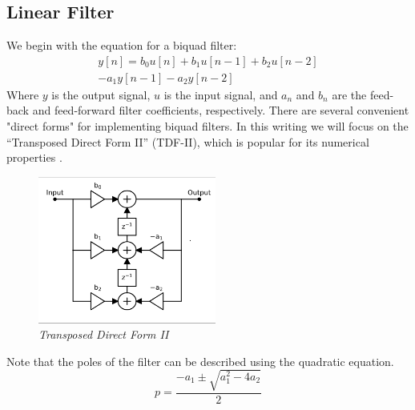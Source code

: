 \documentclass[twoside,a4paper]{article}
\begin{document}
\subsection{Linear Filter}
%
We begin with the equation for a biquad filter:
%
\begin{equation}
\begin{split}
    y[n] = b_0 u[n] + b_1 u[n-1] + b_2 u[n-2] \\ - a_1 y[n-1] - a_2 y[n-2]
\end{split}
    \label{eq:bq}
\end{equation}
%
Where $y$ is the output signal, $u$ is the input signal, and $a_n$ and $b_n$
are the feed-back and feed-forward filter coefficients, respectively.
There are several convenient "direct forms" for implementing biquad filters.
In this writing we will focus on the ``Transposed Direct Form II'' (TDF-II),
which is popular for its numerical properties \cite{JOSFilters}.
%
\begin{figure}[ht]
    \center
    \includegraphics[width=2.3in]{../Pics/TDF-II-White.png}
    \caption{\label{TDF-II}{\it Transposed Direct Form II}}
\end{figure}
%
Note that the poles of the filter can be described using the quadratic
equation.
\begin{equation}
    p = \frac{-a_1 \pm \sqrt{a_1^2- 4a_2}}{2}
    \label{eq:poles_lin}
\end{equation}
%
\end{document}
